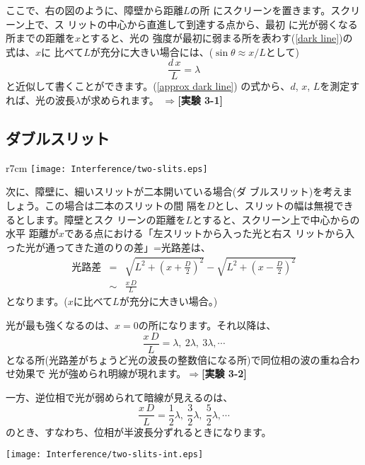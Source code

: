 ここで、右の図のように、障壁から距離$L$の所
にスクリーンを置きます。スクリーン上で、ス
リットの中心から直進して到達する点から、最初
に光が弱くなる所までの距離を$x$とすると、光の
強度が最初に弱まる所を表わす(\ref{dark line})の式は、$x$に 
比べて$L$が充分に大きい場合には、($\sin\theta\approx x/L$として)
\begin{equation}
\frac{d\,x}{L}=\lambda
\label{approx dark line}
\end{equation}
と近似して書くことができます。(\ref{approx dark line})
の式から、$d$, $x$, $L$を測定すれば、光の波長$\lambda$が求められます。
$\Rightarrow${\bf [実験 3-1]}


\subsection{ダブルスリット}


\begin{wrapfigure}[7]{r}{7cm}
\texttt{[image: Interference/two-slits.eps]}
\end{wrapfigure}


次に、障壁に、細いスリットが二本開いている場合(ダ
ブルスリット)を考えましょう。この場合は二本のスリットの間
隔を$D$とし、スリットの幅は無視できるとします。障壁とスク
リーンの距離を$L$とすると、スクリーン上で中心からの水平
距離が$x$である点における「左スリットから入った光と右ス
リットから入った光が通ってきた道のりの差」=光路差は、
\begin{eqnarray}
光路差&=&\sqrt{L^2+\left(x+\frac{D}{2}\right)^2}
-\sqrt{L^2+\left(x-\frac{D}{2}\right)^2}\nonumber\\
&\sim& \frac{x\,D}{L}\nonumber
\end{eqnarray}
となります。($x$に比べて$L$が充分に大きい場合。)

光が最も強くなるのは、$x=0$の所になります。それ以降は、
\[
\frac{x\,D}{L}=\lambda,~2\lambda,~3\lambda,\cdots
\]
となる所(光路差がちょうど光の波長の整数倍になる所)で同位相の波の重ね合わせ効果で
光が強められ明線が現れます。$\Rightarrow${\bf [実験 3-2]}

一方、逆位相で光が弱められて暗線が見えるのは、
\[
\frac{x\,D}{L}=\frac{1}{2}\lambda,~\frac{3}{2}\lambda,~\frac{5}{2}\lambda,\cdots
\]
のとき、すなわち、位相が半波長分ずれるときになります。 

\begin{center}
\texttt{[image: Interference/two-slits-int.eps]}
\end{center}


